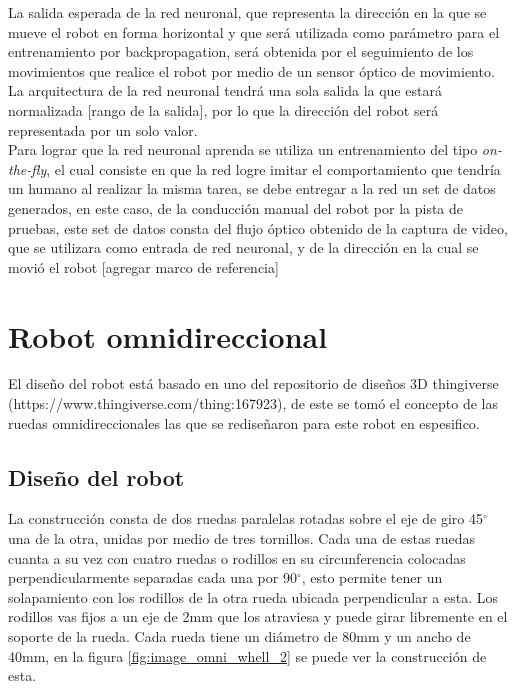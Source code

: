 \documentclass{iccmemoria}
\begin{document}
La salida esperada de la red neuronal, que representa la dirección en la que se mueve el robot en forma horizontal y que será utilizada como parámetro para el entrenamiento por backpropagation, será obtenida por el seguimiento de los movimientos que realice el robot por medio de un sensor óptico de movimiento. La arquitectura de la red neuronal tendrá una sola salida la que estará normalizada [rango de la salida], por lo que la dirección del robot será representada por un solo valor.\\

Para lograr que la red neuronal aprenda se utiliza un entrenamiento del tipo \emph{on-the-fly}, el cual consiste en que la red logre imitar el comportamiento que tendría un humano al realizar la misma tarea, se debe entregar a la red un set de datos generados, en este caso, de la conducción manual del robot por la pista de pruebas, este set de datos consta del flujo óptico obtenido de la captura de video, que se utilizara como entrada de red neuronal, y de la dirección en la cual se movió el robot [agregar marco de referencia] \\

\section{Robot omnidireccional}

El diseño del robot está basado en uno del repositorio de diseños 3D thingiverse (https://www.thingiverse.com/thing:167923), de este se tomó el concepto de las ruedas omnidireccionales las que se rediseñaron para este robot en espesifico.\\

\subsection{Diseño del robot}

La construcción consta de dos ruedas paralelas rotadas sobre el eje de giro 45$^{\circ}$ una de la otra, unidas por medio de tres tornillos. Cada una de estas ruedas cuanta a su vez con cuatro ruedas o rodillos en su circunferencia colocadas perpendicularmente separadas cada una por 90$^{\circ}$, esto permite tener un solapamiento con los rodillos de la otra rueda ubicada perpendicular a esta. Los rodillos vas fijos a un eje de 2mm que los atraviesa y puede girar libremente en el soporte de la rueda. Cada rueda tiene un diámetro de 80mm y un ancho de 40mm, en la figura \ref{fig:image_omni_whell_2} se puede ver la construcción de esta.\\
\end{document}
